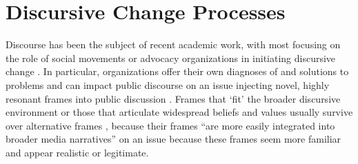 




\section{Discursive Change Processes}

Discourse has been the subject of recent academic work, with most focusing on the role of social movements or advocacy organizations in initiating discursive change \citep{bail_2012,earl_2004,mccammon_et_al_2007,ghaziani_and_baldassarri_2011,vasi_et_al_2015,gamson_and_modigliani_1989}. In particular, organizations offer their own diagnoses of and solutions to problems and can impact public discourse on an issue injecting novel, highly resonant frames into public discussion \citep{benford_and_snow_2000}. Frames that `fit' the broader discursive environment \citep{mccammon_et_al_2007} or those that articulate widespread beliefs and values usually survive over alternative frames \citep{mccammon_et_al_2001,snow_et_al_2007,gamson_and_modigliani_1989}, because their frames ``are more easily integrated into broader media narratives'' on an issue because these frames seem more familiar \citep{bail_2012} and appear realistic or legitimate. 

